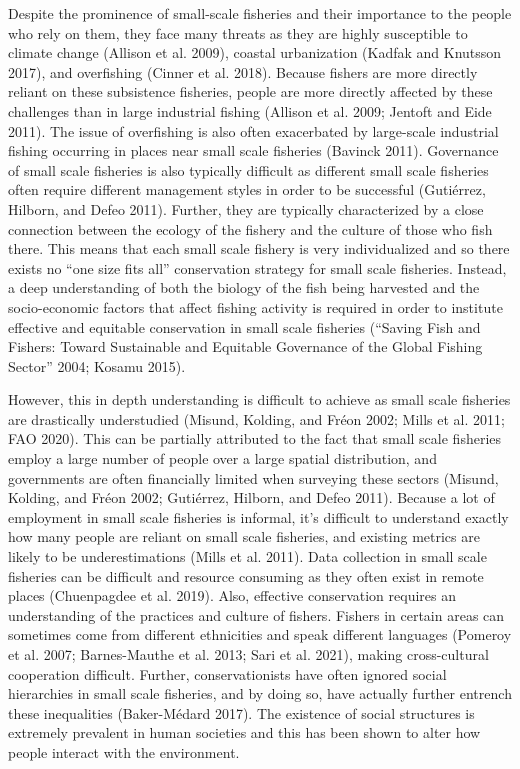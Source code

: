 \documentclass[
]{article}
\begin{document}
Despite the prominence of small-scale fisheries and their importance to the people who rely on them, they face many threats as they are highly susceptible to climate change (Allison et al. 2009), coastal urbanization (Kadfak and Knutsson 2017), and overfishing (Cinner et al. 2018). Because fishers are more directly reliant on these subsistence fisheries, people are more directly affected by these challenges than in large industrial fishing (Allison et al. 2009; Jentoft and Eide 2011). The issue of overfishing is also often exacerbated by large-scale industrial fishing occurring in places near small scale fisheries (Bavinck 2011). Governance of small scale fisheries is also typically difficult as different small scale fisheries often require different management styles in order to be successful (Gutiérrez, Hilborn, and Defeo 2011). Further, they are typically characterized by a close connection between the ecology of the fishery and the culture of those who fish there. This means that each small scale fishery is very individualized and so there exists no ``one size fits all'' conservation strategy for small scale fisheries. Instead, a deep understanding of both the biology of the fish being harvested and the socio-economic factors that affect fishing activity is required in order to institute effective and equitable conservation in small scale fisheries ({``Saving {Fish} and {Fishers}: {Toward} {Sustainable} and {Equitable} {Governance} of the {Global} {Fishing} {Sector}''} 2004; Kosamu 2015).

However, this in depth understanding is difficult to achieve as small scale fisheries are drastically understudied (Misund, Kolding, and Fréon 2002; Mills et al. 2011; FAO 2020). This can be partially attributed to the fact that small scale fisheries employ a large number of people over a large spatial distribution, and governments are often financially limited when surveying these sectors (Misund, Kolding, and Fréon 2002; Gutiérrez, Hilborn, and Defeo 2011). Because a lot of employment in small scale fisheries is informal, it's difficult to understand exactly how many people are reliant on small scale fisheries, and existing metrics are likely to be underestimations (Mills et al. 2011). Data collection in small scale fisheries can be difficult and resource consuming as they often exist in remote places (Chuenpagdee et al. 2019). Also, effective conservation requires an understanding of the practices and culture of fishers. Fishers in certain areas can sometimes come from different ethnicities and speak different languages (Pomeroy et al. 2007; Barnes-Mauthe et al. 2013; Sari et al. 2021), making cross-cultural cooperation difficult. Further, conservationists have often ignored social hierarchies in small scale fisheries, and by doing so, have actually further entrench these inequalities (Baker-Médard 2017). The existence of social structures is extremely prevalent in human societies and this has been shown to alter how people interact with the environment.
\end{document}

